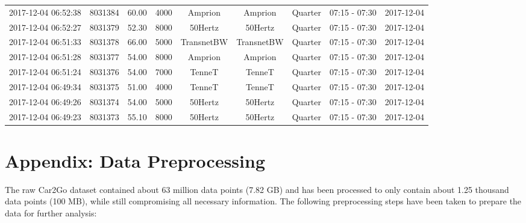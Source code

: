 \documentclass[a4paper, 12pt]{article}
\begin{document}
{\begin{table}
\begin{tabular}{c|cccccccc}
2017-12-04 06:52:38 & 8031384 & 60.00 & 4000 & Amprion & Amprion & Quarter & 07:15 - 07:30 & 2017-12-04\\
2017-12-04 06:52:27 & 8031379 & 52.30 & 8000 & 50Hertz & 50Hertz & Quarter & 07:15 - 07:30 & 2017-12-04\\
2017-12-04 06:51:33 & 8031378 & 66.00 & 5000 & TransnetBW & TransnetBW & Quarter & 07:15 - 07:30 & 2017-12-04\\
2017-12-04 06:51:28 & 8031377 & 54.00 & 8000 & Amprion & Amprion & Quarter & 07:15 - 07:30 & 2017-12-04\\
2017-12-04 06:51:24 & 8031376 & 54.00 & 7000 & TenneT & TenneT & Quarter & 07:15 - 07:30 & 2017-12-04\\
2017-12-04 06:49:34 & 8031375 & 51.00 & 4000 & TenneT & TenneT & Quarter & 07:15 - 07:30 & 2017-12-04\\
2017-12-04 06:49:26 & 8031374 & 54.00 & 5000 & 50Hertz & 50Hertz & Quarter & 07:15 - 07:30 & 2017-12-04\\
2017-12-04 06:49:23 & 8031373 & 55.10 & 8000 & 50Hertz & 50Hertz & Quarter & 07:15 - 07:30 & 2017-12-04\\
\hline
\hline
\end{tabular}
\end{table}
}
\clearpage

\section{Appendix: Data Preprocessing \label{app-data-processing}}
\label{sec:orgb501bd6}
The raw Car2Go dataset contained about 63 million data points (7.82 GB) and has
been processed to only contain about 1.25 thousand data points (100 MB), while
still compromising all necessary information. The following preprocessing steps
have been taken to prepare the data for further analysis:
\end{document}
